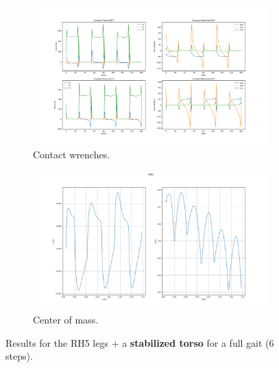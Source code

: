 \begin{figure}[h!]\ContinuedFloat
\begin{subfigure}{1\textwidth}
  	\centering
	\includegraphics[width=.9\linewidth]{Media/Crocoddyl/RH5Torso/FixTorsoFalling/RH5TorsoGait_FixFalling_ContactWrenches.png}
	\caption{Contact wrenches.}
\end{subfigure}
\begin{subfigure}{1\textwidth}
  	\centering
	\includegraphics[width=.9\linewidth]{Media/Crocoddyl/RH5Torso/FixTorsoFalling/RH5TorsoGait_FixFalling_CoM2.png}
	\caption{Center of mass.}
\end{subfigure}
\caption{Results for the RH5 legs + a \textbf{stabilized torso} for a full gait (6 steps).}
\label{fig:rh5Torso_full_gait}
\centering
\end{figure}








 